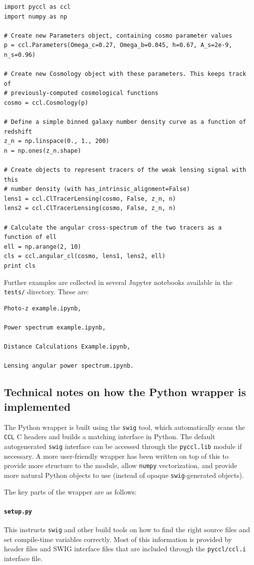 \documentclass[\docopts]{\docclass}
\begin{document}
\begin{verbatim}
import pyccl as ccl
import numpy as np

# Create new Parameters object, containing cosmo parameter values
p = ccl.Parameters(Omega_c=0.27, Omega_b=0.045, h=0.67, A_s=2e-9, n_s=0.96)

# Create new Cosmology object with these parameters. This keeps track of
# previously-computed cosmological functions
cosmo = ccl.Cosmology(p)

# Define a simple binned galaxy number density curve as a function of redshift
z_n = np.linspace(0., 1., 200)
n = np.ones(z_n.shape)

# Create objects to represent tracers of the weak lensing signal with this
# number density (with has_intrinsic_alignment=False)
lens1 = ccl.ClTracerLensing(cosmo, False, z_n, n)
lens2 = ccl.ClTracerLensing(cosmo, False, z_n, n)

# Calculate the angular cross-spectrum of the two tracers as a function of ell
ell = np.arange(2, 10)
cls = ccl.angular_cl(cosmo, lens1, lens2, ell)
print cls
\end{verbatim}

Further examples are collected in several Jupyter notebooks available in the {\tt tests/} directory. These are:
\begin{verbatim}
Photo-z example.ipynb,

Power spectrum example.ipynb,

Distance Calculations Example.ipynb,

Lensing angular power spectrum.ipynb.
\end{verbatim}


\subsection{Technical notes on how the Python wrapper is implemented}
\label{sec:python:technical}

The Python wrapper is built using the {\tt swig} tool, which automatically scans the {\tt CCL} C headers and builds a matching interface in Python. The default autogenerated {\tt swig} interface can be accessed through the {\tt pyccl.lib} module if necessary. A more user-friendly wrapper has been written on top of this to provide more structure to the module, allow {\tt numpy} vectorization, and provide more natural Python objects to use (instead of opaque {\tt swig}-generated objects).

The key parts of the wrapper are as follows:
\paragraph{{\tt setup.py}} This instructs {\tt swig} and other build tools on how to find the right source files and set compile-time variables correctly. Most of this information is provided by header files and SWIG interface files that are included through the {\tt pyccl/ccl.i} interface file.
\end{document}
